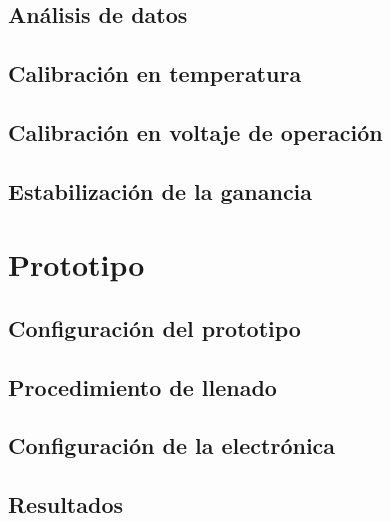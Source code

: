 \documentclass[12pt,a4paper]{book}
\begin{document}
	\section{Análisis de datos}\label{sec:Analisis}
	
	\section{Calibración en temperatura}\label{sec:Temperatura}

	\section{Calibración en voltaje de operación}\label{sec:Voltaje}
	
	\section{Estabilización de la ganancia}\label{sec:Compensacion}

\chapter{Prototipo} \label{chap:Prototipo}  
	\section{Configuración del prototipo}\label{sec:Configuracion}
	
	\section{Procedimiento de llenado}\label{sec:Llenado}
	
	\section{Configuración de la electrónica}\label{sec:Electronica}
	
	\section{Resultados}\label{sec:Resultados}
\end{document}
